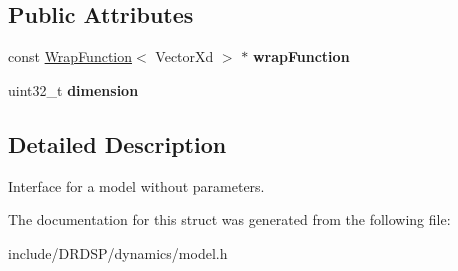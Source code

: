 \subsection*{Public Attributes}
\begin{DoxyCompactItemize}
\item 
\hypertarget{struct_d_r_d_s_p_1_1_model_a286bbeaa673d5e756b1b4e97bdab30f6}{const \hyperlink{struct_d_r_d_s_p_1_1_wrap_function}{Wrap\-Function}$<$ Vector\-Xd $>$ $\ast$ {\bfseries wrap\-Function}}\label{struct_d_r_d_s_p_1_1_model_a286bbeaa673d5e756b1b4e97bdab30f6}

\item 
\hypertarget{struct_d_r_d_s_p_1_1_model_af1e4d4ae5a0dec4460845a58dbd312e9}{uint32\-\_\-t {\bfseries dimension}}\label{struct_d_r_d_s_p_1_1_model_af1e4d4ae5a0dec4460845a58dbd312e9}

\end{DoxyCompactItemize}


\subsection{Detailed Description}
Interface for a model without parameters. 

The documentation for this struct was generated from the following file\-:\begin{DoxyCompactItemize}
\item 
include/\-D\-R\-D\-S\-P/dynamics/model.\-h\end{DoxyCompactItemize}
